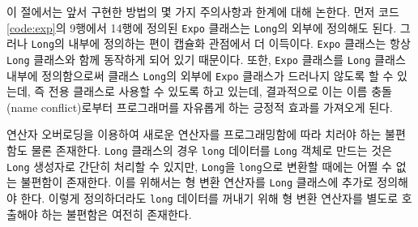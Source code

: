 \documentclass[titlepage]{pnureport}
\begin{document}
이 절에서는 앞서 구현한 방법의 몇 가지 주의사항과 한계에 대해 논한다. 먼저 코드 \ref{code:exp}의 9행에서 14행에 정의된 \texttt{Expo} 클래스는 \texttt{Long}의 외부에 정의해도 된다. 그러나 \texttt{Long}의 내부에 정의하는 편이 캡슐화 관점에서 더 이득이다. \texttt{Expo} 클래스는 항상 \texttt{Long} 클래스와 함께 동작하게 되어 있기 때문이다. 또한, \texttt{Expo} 클래스를 \texttt{Long} 클래스 내부에 정의함으로써 클래스 \texttt{Long}의 외부에 \texttt{Expo} 클래스가 드러나지 않도록 할 수 있는데, 즉 전용 클래스로 사용할 수 있도록 하고 있는데, 결과적으로 이는 이름 충돌(name conflict)로부터 프로그래머를 자유롭게 하는 긍정적 효과를 가져오게 된다.

연산자 오버로딩을 이용하여 새로운 연산자를 프로그래밍함에 따라 치러야 하는 불편함도 물론 존재한다. \texttt{Long} 클래스의 경우 \texttt{long} 데이터를 \texttt{Long} 객체로 만드는 것은 \texttt{Long} 생성자로 간단히 처리할 수 있지만, \texttt{Long}을 \texttt{long}으로 변환할 때에는 어쩔 수 없는 불편함이 존재한다. 이를 위해서는 형 변환 연산자를 \texttt{Long} 클래스에 추가로 정의해야 한다. 이렇게 정의하더라도 \texttt{long} 데이터를 꺼내기 위해 형 변환 연산자를 별도로 호출해야 하는 불편함은 여전히 존재한다.
\end{document}
